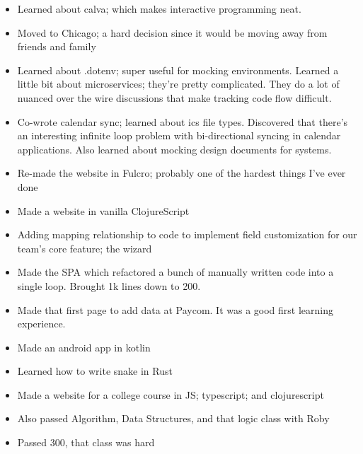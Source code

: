 \documentclass[letterpaper,11pt]{article}
\newcommand{\resumeItem}[1]{
  \item\small{
    {#1 \vspace{-2pt}}
  }
}
\newcommand{\resumeItemListStart}{\begin{itemize}}
\newcommand{\resumeItemListEnd}{\end{itemize}\vspace{-5pt}}
\begin{document}
\resumeItemListStart
\resumeItem{ Learned about calva; which makes interactive
	programming neat. }
\resumeItemListEnd

\resumeItemListStart
\resumeItem{ Moved to Chicago; a hard decision since it would be moving
	away from friends and family }
\resumeItemListEnd

\resumeItemListStart
\resumeItem{ Learned about .dotenv; super useful for mocking environments. Learned
	a little bit about microservices; they're pretty complicated. They do a lot of
	nuanced over the wire discussions that make tracking code flow difficult. }
\resumeItemListEnd

\resumeItemListStart
\resumeItem{ Co-wrote calendar sync; learned about ics file types. Discovered that there's an interesting
	infinite loop problem with bi-directional syncing in calendar applications. Also learned about
	mocking design documents for systems. }
\resumeItemListEnd

\resumeItemListStart
\resumeItem{ Re-made the website in Fulcro; probably one of the hardest things I've ever done }
\resumeItemListEnd

\resumeItemListStart
\resumeItem{ Made a website in vanilla ClojureScript }
\resumeItemListEnd

\resumeItemListStart
\resumeItem{ Adding mapping relationship to code to implement field customization for our team's core feature; the wizard }
\resumeItemListEnd


\resumeItemListStart
\resumeItem{ Made the SPA which refactored a bunch of manually written code into a single loop. Brought 1k lines down to 200. }
\resumeItemListEnd

\resumeItemListStart
\resumeItem{ Made that first page to add data at Paycom. It was a good first learning experience. }
\resumeItemListEnd

\resumeItemListStart
\resumeItem{ Made an android app in kotlin }
\resumeItemListEnd

\resumeItemListStart
\resumeItem{ Learned how to write snake in Rust }
\resumeItemListEnd

\resumeItemListStart
\resumeItem{ Made a website for a college course in JS;
	typescript; and clojurescript }
\resumeItemListEnd

\resumeItemListStart
\resumeItem{ Also passed Algorithm, Data Structures, and that logic class with Roby }
\resumeItemListEnd

\resumeItemListStart
\resumeItem{ Passed 300, that class was hard }
\resumeItemListEnd
\end{document}
